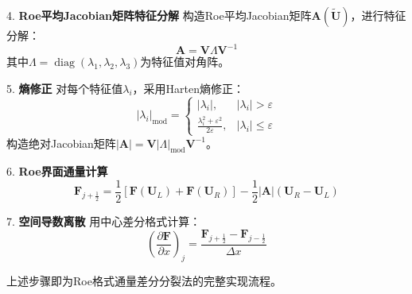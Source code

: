 \documentclass[12pt,a4paper]{article}
\begin{document}
4. \textbf{Roe平均Jacobian矩阵特征分解}  
    构造Roe平均Jacobian矩阵$\mathbf{A}(\tilde{\mathbf{U}})$，进行特征分解：
    \[
    \mathbf{A} = \mathbf{V} \Lambda \mathbf{V}^{-1}
    \]
    其中$\Lambda = \operatorname{diag}(\lambda_1, \lambda_2, \lambda_3)$为特征值对角阵。

5. \textbf{熵修正}  
    对每个特征值$\lambda_i$，采用Harten熵修正：
    \[
    |\lambda_i|_{\text{mod}} = 
    \begin{cases}
    |\lambda_i|, & |\lambda_i| > \varepsilon \\
    \frac{\lambda_i^2 + \varepsilon^2}{2\varepsilon}, & |\lambda_i| \leq \varepsilon
    \end{cases}
    \]
    构造绝对Jacobian矩阵$|\mathbf{A}| = \mathbf{V} |\Lambda|_{\text{mod}} \mathbf{V}^{-1}$。

6. \textbf{Roe界面通量计算}  
    \[
    \mathbf{F}_{j+\frac{1}{2}} = \frac{1}{2} \left[ \mathbf{F}(\mathbf{U}_L) + \mathbf{F}(\mathbf{U}_R) \right] - \frac{1}{2} |\mathbf{A}| (\mathbf{U}_R - \mathbf{U}_L)
    \]

7. \textbf{空间导数离散}  
    用中心差分格式计算：
    \[
    \left( \frac{\partial \mathbf{F}}{\partial x} \right)_j = \frac{\mathbf{F}_{j+\frac{1}{2}} - \mathbf{F}_{j-\frac{1}{2}}}{\Delta x}
    \]

上述步骤即为Roe格式通量差分分裂法的完整实现流程。


\newpage   
\end{document}

